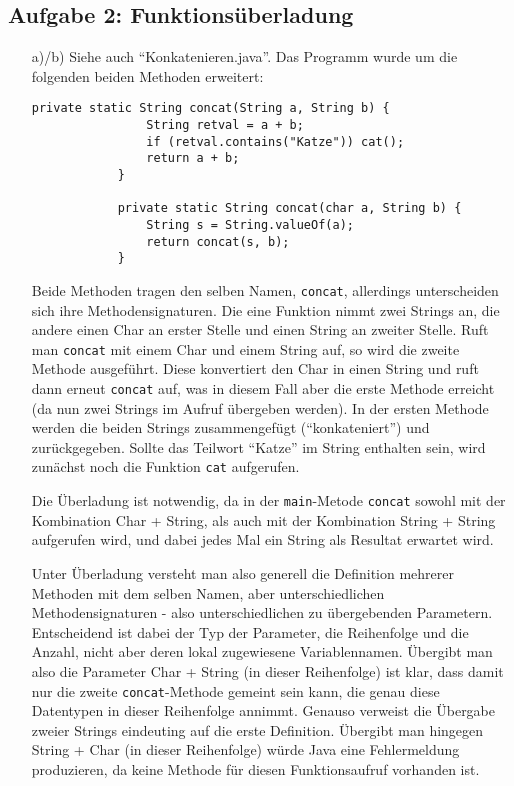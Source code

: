 \documentclass{article}
\begin{document}
    \subsection*{Aufgabe 2: Funktionsüberladung}
    \begin{enumerate}
        \item[a)/b)] Siehe auch "`Konkatenieren.java"'. Das Programm wurde um die folgenden beiden Methoden erweitert:
        \begin{lstlisting}[numbers=none]
            private static String concat(String a, String b) {
                String retval = a + b;
                if (retval.contains("Katze")) cat();
                return a + b;
            }
        
            private static String concat(char a, String b) {
                String s = String.valueOf(a);
                return concat(s, b);
            }
        \end{lstlisting} 
        Beide Methoden tragen den selben Namen, \lstinline{concat}, allerdings unterscheiden sich ihre Methodensignaturen. Die eine Funktion nimmt zwei Strings an, die andere einen Char an erster Stelle und einen String an zweiter Stelle. Ruft man \lstinline{concat} mit einem Char und einem String auf, so wird die zweite Methode ausgeführt. Diese konvertiert den Char in einen String und ruft dann erneut \lstinline{concat} auf, was in diesem Fall aber die erste Methode erreicht (da nun zwei Strings im Aufruf übergeben werden). In der ersten Methode werden die beiden Strings zusammengefügt ("`konkateniert"') und zurückgegeben. Sollte das Teilwort "`Katze"' im String enthalten sein, wird zunächst noch die Funktion \lstinline{cat} aufgerufen. 

        Die Überladung ist notwendig, da in der \lstinline{main}-Metode \lstinline{concat} sowohl mit der Kombination Char + String, als auch mit der Kombination String + String aufgerufen wird, und dabei jedes Mal ein String als Resultat erwartet wird. 

        Unter Überladung versteht man also generell die Definition mehrerer Methoden mit dem selben Namen, aber unterschiedlichen Methodensignaturen - also unterschiedlichen zu übergebenden Parametern. Entscheidend ist dabei der Typ der Parameter, die Reihenfolge und die Anzahl, nicht aber deren lokal zugewiesene Variablennamen. Übergibt man also die Parameter Char + String (in dieser Reihenfolge) ist klar, dass damit nur die zweite \lstinline{concat}-Methode gemeint sein kann, die genau diese Datentypen in dieser Reihenfolge annimmt. Genauso verweist die Übergabe zweier Strings eindeuting auf die erste Definition. Übergibt man hingegen String + Char (in dieser Reihenfolge) würde Java eine Fehlermeldung produzieren, da keine Methode für diesen Funktionsaufruf vorhanden ist. 


\end{enumerate}
\end{document}
